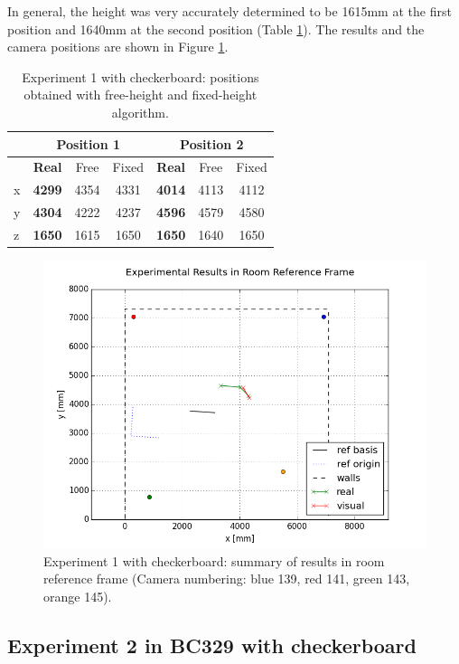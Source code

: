 In general, the height was very accurately determined to be 1615mm at the first position and 1640mm at the second position (Table \ref{tab:res2_errors}).
The results and the camera positions are shown in Figure \ref{fig:res2_room}.

\begin{table}
\begin{center}
\caption{Experiment 1 with checkerboard: positions obtained with free-height and fixed-height algorithm.}
\begin{tabular}{lcccccc}
\toprule
    & \multicolumn{3}{c}{\textbf{Position 1}} & \multicolumn{3}{c}{\textbf{Position 2}} \\
\midrule
& \textbf{Real} & Free & Fixed & \textbf{Real} & Free & Fixed \\
x   & \textbf{4299} & 4354 & 4331 & \textbf{4014} & 4113 & 4112  \\
y   & \textbf{4304} & 4222 & 4237 & \textbf{4596} & 4579 & 4580 \\
z   & \textbf{1650} & 1615 & 1650 & \textbf{1650} & 1640 & 1650 \\
\bottomrule
\end{tabular}
\label{tab:res2_errors}
\end{center}
\end{table}

\begin{figure}
    \centering
    \includegraphics[width=.6\linewidth]{files/res2_room.png}
    \caption{Experiment 1 with checkerboard: summary of results in room reference frame (Camera numbering: blue 139, red 141, green 143, orange 145).}
    \label{fig:res2_room}
\end{figure}


\subsection{Experiment 2 in BC329 with checkerboard}

